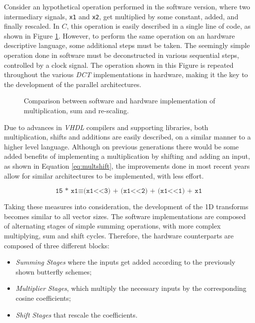 Consider an hypothetical operation performed in the software version, where two intermediary signals, \texttt{x1} and \texttt{x2}, get multiplied by some constant, added, and finally rescaled. In $C$, this operation is easily described in a single line of code, as shown in Figure \ref{fig:hardsoft}. However, to perform the same operation on an hardware descriptive language, some additional steps must be taken. The seemingly simple operation done in software must be deconstructed in various sequential steps, controlled by a clock signal. The operation shown in this Figure is repeated throughout the various \emph{DCT} implementations in hardware, making it the key to the development of the parallel architectures.

\begin{figure}[!htb]
    \centering
    
    \caption{Comparison between software and hardware implementation of multiplication, sum and re-scaling.}
    \label{fig:hardsoft}
\end{figure}

Due to advances in \emph{VHDL} compilers and supporting libraries, both multiplication, shifts and additions are easily described, on a similar manner to a higher level language. Although on previous generations there would be some added benefits of implementing a multiplication by shifting and adding an input, as shown in Equation \ref{eq:multshift}, the improvements done in most recent years allow for similar architectures to be implemented, with less effort.

\begin{equation} \label{eq:multshift}
    \texttt{15 * x1} \equiv \texttt{(x1<<3) + (x1<<2) + (x1<<1) + x1}
\end{equation}

Taking these measures into consideration, the development of the 1D transforms becomes similar to all vector sizes. The software implementations are composed of alternating stages of simple summing operations, with more complex multiplying, sum and shift cycles. Therefore, the hardware counterparts are composed of three different blocks:

\begin{itemize}
    \item \emph{Summing Stages} where the inputs get added according to the previously shown butterfly schemes;
    \item \emph{Multiplier Stages}, which multiply the necessary inputs by the corresponding cosine coefficients;
    \item \emph{Shift Stages} that rescale the coefficients.
\end{itemize} 

